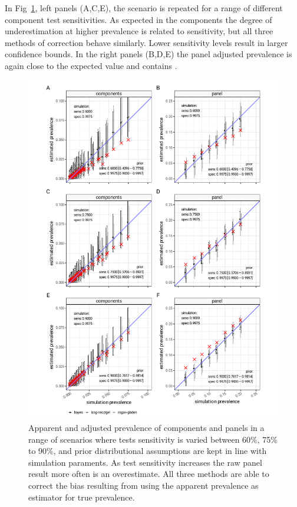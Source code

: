 \documentclass[a4paper, 12pt, twoside]{article}
\begin{document}
In Fig~\ref{fig:B4}, left panels (A,C,E), the scenario is repeated for a range of different component test sensitivities. As expected in the components the degree of underestimation at higher prevalence is related to sensitivity, but all three methods of correction behave similarly. Lower sensitivity levels result in larger confidence bounds. In the right panels (B,D,E) the panel adjusted prevalence is again close to the expected value and contains .

\begin{figure}[h!]
\centering
  \includegraphics{fig/simulation-result-same-sens}
  \caption{Apparent and adjusted prevalence of components and panels in a range of scenarios where tests sensitivity is varied between 60\%, 75\% to 90\%, and prior distributional assumptions are kept in line with simulation paraments. As test sensitivity increases the raw panel result more often is an overestimate. All three methods are able to correct the bias resulting from using the apparent prevalence as estimator for true prevalence.}
\label{fig:B4}
\end{figure}
\end{document}
